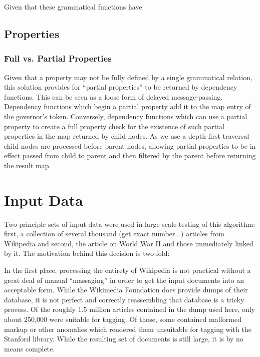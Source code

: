 \documentclass[11pt]{article}
\begin{document}
Given that these grammatical functions have 

\subsection{Properties}
\label{algo:properties}

\subsubsection{Full vs. Partial Properties}

Given that a property may not be fully defined by a single grammatical relation, this solution provides for ``partial properties'' to be returned by dependency functions.  This can be seen as a loose form of delayed message-passing.  Dependency functions which begin a partial property add it to the map entry of the governor's token.  Conversely, dependency functions which can use a partial property to create a full property check for the existence of such partial properties in the map returned by child nodes.  As we use a depth-first traversal child nodes are processed before parent nodes, allowing partial properties to be in effect passed from child to parent and then filtered by the parent before returning the result map.

\section{Input Data}

Two principle sets of input data were used in large-scale testing of this algorithm: first, a collection of several thousand (get exact number...) articles from Wikipedia and second, the article on World War II and those immediately linked by it.  The motivation behind this decision is two-fold:

In the first place, processing the entirety of Wikipedia is not practical without a great deal of manual ``massaging'' in order to get the input documents into an acceptable form.  While the Wikimedia Foundation does provide dumps of their database, it is not perfect and correctly reassembling that database is a tricky process.  Of the roughly 1.5 million articles contained in the dump used here, only about 250,000 were suitable for tagging.  Of those, some contained malformed markup or other anomalies which rendered them unsuitable for tagging with the Stanford library.  While the resulting set of documents is still large, it is by no means complete.
\end{document}
